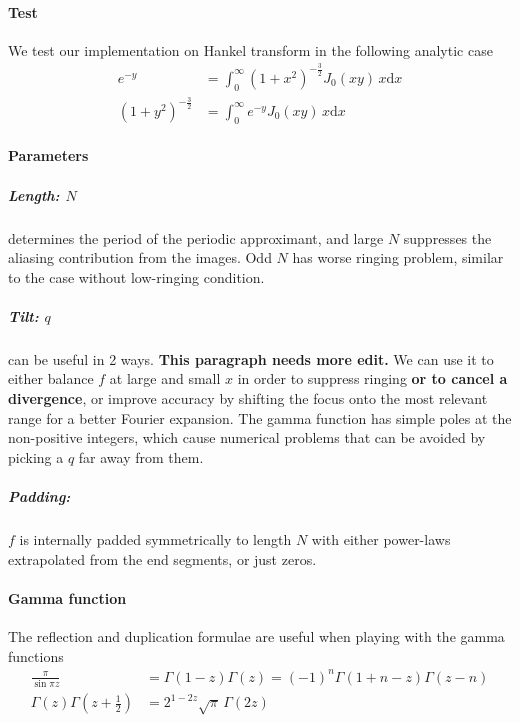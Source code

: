 \documentclass{article}
\renewcommand{\d}{\mathrm{d}}
\begin{document}
\paragraph{Test}
We test our implementation on Hankel transform in the following analytic case
\begin{align}
    e^{-y} &= \int_0^\infty (1+x^2)^{-\frac32} J_0(xy) \,x\d x \\
    (1+y^2)^{-\frac32} &= \int_0^\infty e^{-y} J_0(xy) \,x\d x
\end{align}


\paragraph{Parameters}


\subparagraph{Length: $N$}
determines the period of the periodic approximant, and large $N$ suppresses
the aliasing contribution from the images.
Odd $N$ has worse ringing problem, similar to the case without low-ringing condition.


\subparagraph{Tilt: $q$}
can be useful in 2 ways.
\textbf{This paragraph needs more edit.}
We can use it to either balance $f$ at large and small $x$ in order to suppress
ringing \textbf{or to cancel a divergence}, or improve accuracy by shifting the
focus onto the most relevant range for a better Fourier expansion.
The gamma function has simple poles at the non-positive integers, which cause
numerical problems that can be avoided by picking a $q$ far away from them.


\subparagraph{Padding:}
$f$ is internally padded symmetrically to length $N$ with either power-laws
extrapolated from the end segments, or just zeros.


\paragraph{Gamma function}
The reflection and duplication formulae are useful when playing with the gamma
functions
\begin{align}
    \frac\pi{\sin\pi z} &= \Gamma(1-z)\Gamma(z) = (-1)^n\Gamma(1+n-z)\Gamma(z-n) \\
    \Gamma(z)\Gamma(z+\tfrac12) &= 2^{1-2z}\sqrt\pi\,\Gamma(2z)
\end{align}




\end{document}

